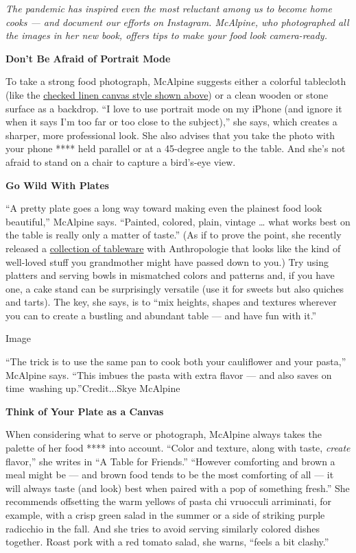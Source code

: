 \emph{The pandemic has inspired even the most reluctant among us to
become home cooks --- and document our efforts on Instagram. McAlpine,
who photographed all the images in her new book, offers tips to make
your food look camera-ready.}

\textbf{Don't Be Afraid of Portrait Mode}

To take a strong food photograph, McAlpine suggests either a colorful
tablecloth (like the
\href{https://theedition94.com/collections/just-in/products/canvas-mimi-vichy-table-cloth-large-145-x-350}{checked
linen canvas style shown above}) or a clean wooden or stone surface as a
backdrop. ``I love to use portrait mode on my iPhone (and ignore it when
it says I'm too far or too close to the subject),'' she says, which
creates a sharper, more professional look. She also advises that you
take the photo with your phone **** held parallel or at a 45-degree
angle to the table. And she's not afraid to stand on a chair to capture
a bird's-eye view.

\textbf{Go Wild With Plates}

``A pretty plate goes a long way toward making even the plainest food
look beautiful,'' McAlpine says. ``Painted, colored, plain, vintage
\ldots{} what works best on the table is really only a matter of
taste.'' (As if to prove the point, she recently released a
\href{https://www.anthropologie.com/brands/skye-mcalpine}{collection of
tableware} with Anthropologie that looks like the kind of well-loved
stuff you grandmother might have passed down to you.) Try using platters
and serving bowls in mismatched colors and patterns and, if you have
one, a cake stand can be surprisingly versatile (use it for sweets but
also quiches and tarts). The key, she says, is to ``mix heights, shapes
and textures wherever you can to create a bustling and abundant table
--- and have fun with it.''

Image

``The trick is to use the same pan to cook both your cauliflower and
your pasta,'' McAlpine says. ``This imbues the pasta with extra flavor
--- and also saves on time~washing up.''Credit...Skye McAlpine

\textbf{Think of Your Plate as a Canvas}

When considering what to serve or photograph, McAlpine always takes the
palette of her food **** into account. ``Color and texture, along with
taste, \emph{create} flavor,'' she writes in ``A Table for Friends.''
``However comforting and brown a meal might be --- and brown food tends
to be the most comforting of all --- it will always taste (and look)
best when paired with a pop of something fresh.'' She recommends
offsetting the warm yellows of pasta chi vruocculi arriminati, for
example, with a crisp green salad in the summer or a side of striking
purple radicchio in the fall. And she tries to avoid serving similarly
colored dishes together. Roast pork with a red tomato salad, she warns,
``feels a bit clashy.''


